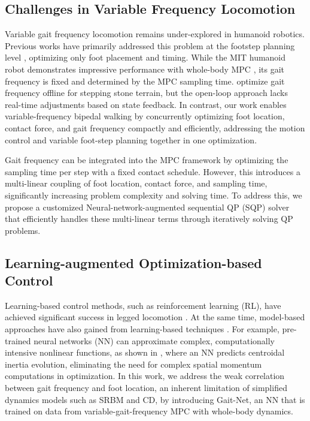 \subsection{Challenges in Variable Frequency Locomotion}
Variable gait frequency locomotion remains under-explored in humanoid robotics. 
Previous works have primarily addressed this problem at the footstep planning level \cite{khadiv2016step, griffin2017walking, nguyen2017dynamic, xiang2024adaptive}, optimizing only foot placement and timing.
While the MIT humanoid robot demonstrates impressive performance with whole-body MPC \cite{khazoom2024tailoring}, its gait frequency is fixed and determined by the MPC sampling time. \citet{li2023dynamic} optimize gait frequency offline for stepping stone terrain, but the open-loop approach lacks real-time adjustments based on state feedback. In contrast, our work enables variable-frequency bipedal walking by concurrently optimizing foot location, contact force, and gait frequency compactly and efficiently, addressing the motion control and variable foot-step planning together in one optimization.

Gait frequency can be integrated into the MPC framework by optimizing the sampling time per step with a fixed contact schedule. However, this introduces a multi-linear coupling of foot location, contact force, and sampling time, significantly increasing problem complexity and solving time. To address this, we propose a customized Neural-network-augmented sequential QP (SQP) solver that efficiently handles these multi-linear terms through iteratively solving QP problems.

\subsection{Learning-augmented Optimization-based Control}

Learning-based control methods, such as reinforcement learning (RL), have achieved significant success in legged locomotion \cite{li2021reinforcement, margolis2024rapid, krishna2022linear, bao2024deep}. At the same time, model-based approaches have also gained from learning-based techniques \cite{bang2024variable, el2024real, chen2024learning, romualdi2024online}. For example, pre-trained neural networks (NN) can approximate complex, computationally intensive nonlinear functions, as shown in \cite{bang2024variable}, where an NN predicts centroidal inertia evolution, eliminating the need for complex spatial momentum computations in optimization. In this work, we address the weak correlation between gait frequency and foot location, an inherent limitation of simplified dynamics models such as SRBM and CD, by introducing Gait-Net, an NN that is trained on data from variable-gait-frequency MPC with whole-body dynamics.


